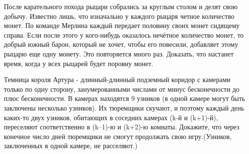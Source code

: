 \begin{problems}
\item  После карательного похода рыцари собрались за круглым столом и делят свою добычу. Известно лишь, что изначально у каждого рыцаря четное количество монет. По команде Мерлина каждый передает половину своих монет сидящему справа. Если после этого у кого-нибудь оказалось нечётное количество монет, то добрый южный барон, который не хочет, чтобы его повесили, добавляет этому рыцарю еще одну монету. Это повторяется много раз.  Доказать, что настанет время, когда у всех рыцарей будет поровну монет.

\item Темница короля Артура - длинный-длинный подземный коридор с камерами только по одну сторону, занумерованными числами от минус бесконечности до плюс бесконечности. В камерах находятся 9 узников (в одной камере могут быть заключены несколько узников). Их тюремщики скучают, и поэтому каждый день каких-то двух узников, обитающих в соседних камерах (k-й и (k+1)-й), переселяют соответственно в (k–1)-ю и (k+2)-ю комнаты. Докажите, что через конечное число дней тюремщики не смогут продолжать свою игру.(Узников, заключенных в одной камере, не расселяют.)


\end{problems}
